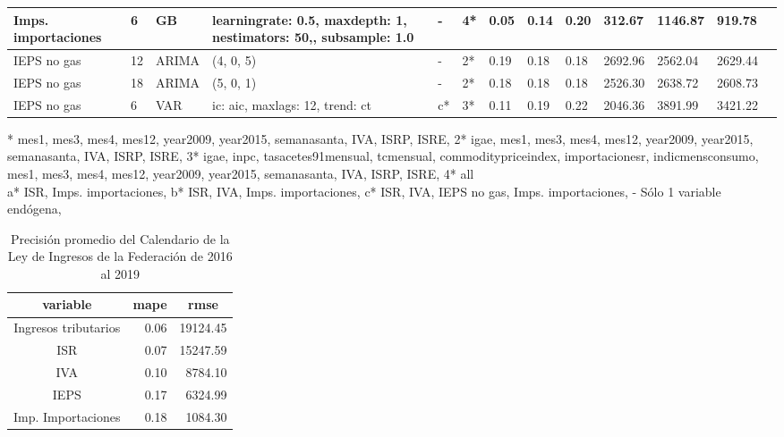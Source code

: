 \documentclass[a4paper, 11pt]{article}
\begin{document}
\begin{landscape}
\begin{longtable}{p{3em}p{3em}p{5em}p{7em}p{2em}p{2em}p{2em}p{2em}p{2em}p{2em}p{2em}p{2em}p{2em}}
Imps. importaciones & 6     & GB    & learningrate: 0.5, maxdepth: 1, nestimators: 50,, subsample: 1.0 & -     & 4*    & 0.05  & 0.14  & 0.20  & 312.67 & 1146.87 & 919.78\\
\hline
IEPS no gas & 12    & ARIMA & (4, 0, 5) & -     & 2*    & 0.19  & 0.18  & 0.18  & 2692.96 & 2562.04 & 2629.44\\
IEPS no gas & 18    & ARIMA & (5, 0, 1) & -     & 2*    & 0.18  & 0.18  & 0.18  & 2526.30 & 2638.72 & 2608.73\\
IEPS no gas & 6     & VAR   & ic: aic, maxlags: 12, trend: ct & c*    & 3*    & 0.11  & 0.19  & 0.22  & 2046.36 & 3891.99 & 3421.22\\
\hline \hline
\end{longtable}%
*	mes1, mes3, mes4, mes12, year2009, year2015, semanasanta, IVA, ISRP, ISRE, 
2*	igae, mes1, mes3, mes4, mes12, year2009, year2015, semanasanta, IVA, ISRP, ISRE, 
3*	igae, inpc, tasacetes91mensual, tcmensual, commoditypriceindex, importacionesr, indicmensconsumo, mes1, mes3, mes4, mes12, year2009, year2015, semanasanta, IVA, ISRP, ISRE, 
4*	all \\
\noindent
a*	ISR, Imps. importaciones, 
b*	ISR, IVA, Imps. importaciones, 
c*	ISR, IVA, IEPS no gas, Imps. importaciones, 
-	Sólo 1 variable endógena, 
\end{landscape}
 
\begin{longtable}{crr}
\caption{\label{tab:lif}Precisión promedio del Calendario de la Ley de Ingresos de la Federación de 2016 al 2019}\\
\textbf{variable} & \multicolumn{1}{c}{\textbf{mape}} & \multicolumn{1}{c}{\textbf{rmse}} \\ \hline \hline
Ingresos tributarios & 0.06  & 19124.45 \\ \hline
ISR   & 0.07  & 15247.59 \\ \hline
IVA   & 0.10  & 8784.10 \\ \hline
IEPS  & 0.17  & 6324.99 \\ \hline
Imp. Importaciones & 0.18  & 1084.30 \\ \hline \hline
\end{longtable}%
\end{document}
